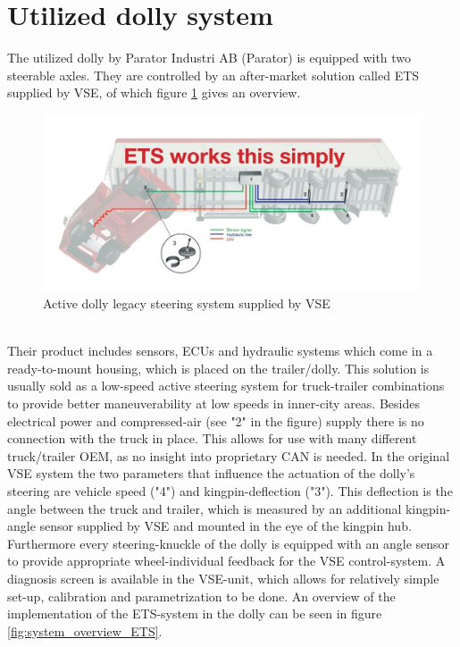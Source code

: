 \documentclass[ExampleMasters.tex]{subfiles}
\begin{document}
\section{Utilized dolly system}
\label{sec:dolly_system}
The utilized dolly by Parator Industri AB (Parator) is equipped with two steerable axles. They are controlled by an after-market solution called \gls{ETS} supplied by \gls{VSE}, of which figure \ref{fig:legacy_system_vse} gives an overview.
\begin{figure}[!htb]
	\centering
	\includegraphics[width=1.0\linewidth]{figures/legacy_system_vse}
	\caption{Active dolly legacy steering system supplied by VSE\cite{dolly_datasheet}}
	\label{fig:legacy_system_vse}
\end{figure} \\
 Their product includes sensors, \gls{ECU}s and hydraulic systems which come in a ready-to-mount housing, which is placed on the trailer/dolly. This solution is usually sold as a low-speed active steering system for truck-trailer combinations to provide better maneuverability at low speeds in inner-city areas. Besides electrical power and compressed-air (see "2" in the figure) supply there is no connection with the truck in place. This allows for use with many different truck/trailer \gls{OEM}, as no insight into proprietary \gls{CAN} is needed. In the original \gls{VSE} system the two parameters that influence the actuation of the dolly's steering are vehicle speed ("4") and kingpin-deflection ("3"). This deflection is the angle between the truck and trailer, which is measured by an additional kingpin-angle sensor supplied by \gls{VSE} and mounted in the eye of the kingpin hub. Furthermore every steering-knuckle of the dolly is equipped with an angle sensor to provide appropriate wheel-individual feedback for the \gls{VSE} control-system. A diagnosis screen is available in the \gls{VSE}-unit, which allows for relatively simple set-up, calibration and parametrization to be done.\cite{dolly_datasheet} An overview of the implementation of the \gls{ETS}-system in the dolly can be seen in figure \ref{fig:system_overview_ETS}. 
\end{document}
